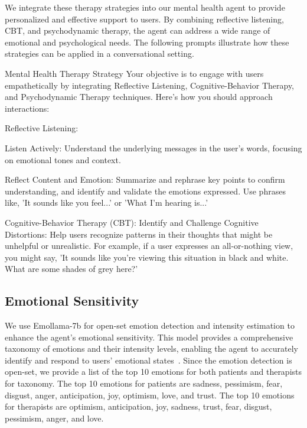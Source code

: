We integrate these therapy strategies into our mental health agent to provide personalized and effective support to users. By combining reflective listening, CBT, and psychodynamic therapy, the agent can address a wide range of emotional and psychological needs. The following prompts illustrate how these strategies can be applied in a conversational setting.

\begin{mybox}{Mental Health Therapy Strategy}
Your objective is to engage with users empathetically by integrating Reflective Listening, Cognitive-Behavior Therapy, and Psychodynamic Therapy techniques. Here's how you should approach interactions:

Reflective Listening:

Listen Actively: Understand the underlying messages in the user's words, focusing on emotional tones and context.

Reflect Content and Emotion: Summarize and rephrase key points to confirm understanding, and identify and validate the emotions expressed. Use phrases like, 'It sounds like you feel...' or 'What I'm hearing is...'

Cognitive-Behavior Therapy (CBT): Identify and Challenge Cognitive Distortions: Help users recognize patterns in their thoughts that might be unhelpful or unrealistic. For example, if a user expresses an all-or-nothing view, you might say, 'It sounds like you’re viewing this situation in black and white. What are some shades of grey here?'


\end{mybox}

\subsection{Emotional Sensitivity}\label{appendix:emotion}
We use Emollama-7b for open-set emotion detection and intensity estimation to enhance the agent's emotional sensitivity. This model provides a comprehensive taxonomy of emotions and their intensity levels, enabling the agent to accurately identify and respond to users' emotional states~\cite{liu2024emollms}.
Since the emotion detection is open-set, we provide a list of the top 10 emotions for both patients and therapists for taxonomy. The top 10 emotions for patients are sadness, pessimism, fear, disgust, anger, anticipation, joy, optimism, love, and trust. The top 10 emotions for therapists are optimism, anticipation, joy, sadness, trust, fear, disgust, pessimism, anger, and love.

